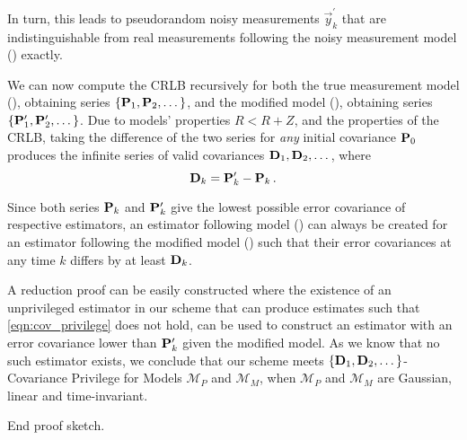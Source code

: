 \documentclass[letterpaper, 10 pt, conference]{IEEEtran}
\theoremstyle{definition}
\theoremstyle{definition}
\theoremstyle{remark}
\begin{document}
In turn, this leads to pseudorandom noisy measurements $\vec{y}^\prime_k$ that are indistinguishable from real measurements following the noisy measurement model () exactly.

We can now compute the CRLB recursively for both the true measurement model (), obtaining series $\{{{\mathbf{P}}}_1,{{\mathbf{P}}}_2,\dots\}$, and the modified model (), obtaining series $\{{{\mathbf{P}}}^\prime_1,{{\mathbf{P}}}^\prime_2,\dots\}$. Due to models' properties $R<R+Z$, and the properties of the CRLB, taking the difference of the two series for \textit{any} initial covariance ${{\mathbf{P}}}_0$ produces the infinite series of valid covariances ${{\mathbf{D}}}_1,{{\mathbf{D}}}_2,\dots$, where
\begin{equation}
   {\ensuremath{{\mathbf{D}}}}_k = {{\mathbf{P}}}^\prime_k - {{\mathbf{P}}}_k\,.
\end{equation}

Since both series ${{\mathbf{P}}}_k$ and ${{\mathbf{P}}}^\prime_k$ give the lowest possible error covariance of respective estimators, an estimator following model () can always be created for an estimator following the modified model () such that their error covariances at any time $k$ differs by at least ${{\mathbf{D}}}_k$.

A reduction proof can be easily constructed where the existence of an unprivileged estimator in our scheme that can produce estimates such that \eqref{eqn:cov_privilege} does not hold, can be used to construct an estimator with an error covariance lower than ${{\mathbf{P}}}^\prime_k$ given the modified model. As we know that no such estimator exists, we conclude that our scheme meets $\{{{\mathbf{D}}}_1,{{\mathbf{D}}}_2,\dots\}$-Covariance Privilege for Models $\mathcal{M}_P$ and $\mathcal{M}_M$, when $\mathcal{M}_P$ and $\mathcal{M}_M$ are Gaussian, linear and time-invariant.

End proof sketch.
\end{document}
